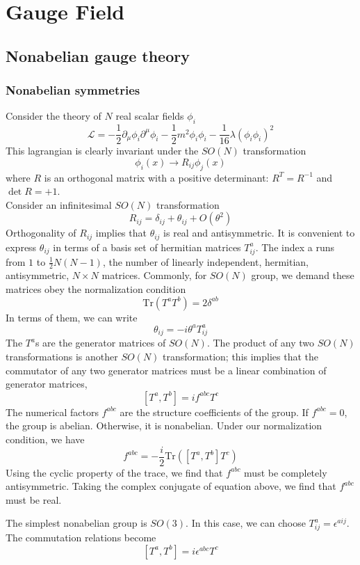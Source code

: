 \documentclass[cyan]{elegantnote}
\author{Yuyang Songsheng}
\begin{document}
\maketitle
\tableofcontents
\chapter{Gauge Field}
\section{Nonabelian gauge theory}
\subsection{Nonabelian symmetries}
Consider the theory of $N$ real scalar fields $\phi_i$
\[\mathcal{L} = -\frac{1}{2}\partial_{\mu}\phi_i \partial^{\mu}\phi_i - \frac{1}{2}m^2\phi_i\phi_i - \frac{1}{16}\lambda(\phi_i\phi_i)^2\]
This lagrangian is clearly invariant under the $SO(N)$ transformation
\[\phi_i(x) \to R_{ij}\phi_j(x)\]
where $R$ is an orthogonal matrix with a positive determinant: $R^T = R^{-1}$ and $\det R = +1$.
\\
Consider an infinitesimal $SO(N)$ transformation
\[R_{ij} = \delta_{ij} + \theta_{ij} + O(\theta^2)\]
Orthogonality of $R_{ij}$ implies that $\theta_{ij}$ is real and antisymmetric. It is convenient to express $\theta_{ij}$ in terms of a basis set of hermitian matrices $T^a_{ij}$. The index a runs from $1$ to $\frac{1}{2}N(N-1)$, the number of linearly independent, hermitian, antisymmetric, $N \times N$ matrices. Commonly, for $SO(N)$ group, we demand these matrices obey the normalization condition
\[\mathrm{Tr}(T^a T^b) = 2\delta^{ab}\]
In terms of them, we can write
\[\theta_{ij} = -i\theta^a T^a_{ij}\]
The $T^a$s are the generator matrices of $SO(N)$. The product of any two $SO(N)$ transformations is another $SO(N)$ transformation; this implies that the commutator of any two generator matrices must be a linear combination of generator matrices,
\[[T^a,T^b] = if^{abc}T^c\]
The numerical factors $f^{abc}$ are the structure coefficients of the group. If $f^{abc} = 0$, the group is abelian. Otherwise, it is nonabelian. Under our normalization condition, we have
\[f^{abc} = -\frac{i}{2} \mathrm{Tr} \left([T^a,T^b]T^c \right)\]
Using the cyclic property of the trace, we find that $f^{abc}$ must be completely antisymmetric. Taking the complex conjugate of equation above, we find that $f^{abc}$ must be real.

\begin{example}
The simplest nonabelian group is $SO(3)$. In this case, we can choose $T^a_{ij} = \epsilon^{aij}$. The commutation relations become
\[[T^a,T^b] = i\epsilon^{abc}T^c\]
\end{example}
\end{document}
